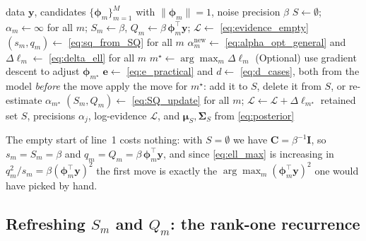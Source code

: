 \documentclass[a4paper]{article}
\renewcommand{\vec}[1]{\boldsymbol{#1}}
\begin{document}
\begin{algorithm}
\caption{Sequential ARD by greedy evidence maximisation \autocite{tipping2003fast}.}
\label{alg:seq_ard}
\begin{algorithmic}[1]
\Require data $\mathbf y$, candidates $\{\vec \phi_m\}_{m=1}^M$ with $\|\vec \phi_m\| = 1$, noise precision $\beta$
\State $S \gets \emptyset$; \quad $\alpha_m \gets \infty$ for all $m$; \quad $S_m \gets \beta$, $Q_m \gets \beta \, \vec \phi_m^\top \mathbf y$; \quad $\mathcal L \gets$ \eqref{eq:evidence_empty}
\Repeat
    \State $(s_m, q_m) \gets$ \eqref{eq:sq_from_SQ} for all $m$
    \State $\alpha_m^{\mathrm{new}} \gets$ \eqref{eq:alpha_opt_general} and $\Delta \ell_m \gets$ \eqref{eq:delta_ell} for all $m$
    \State $m^\star \gets \arg\max_m \Delta \ell_m$
    \State (Optional) use gradient descent to adjust $\vec \phi_{m^\star}$
    \State $\vec e \gets$ \eqref{eq:e_practical} and $d \gets$ \eqref{eq:d_cases}, both from the model \emph{before} the move
    \State apply the move for $m^\star$: add it to $S$, delete it from $S$, or re-estimate $\alpha_{m^\star}$
    \State $(S_m, Q_m) \gets$ \eqref{eq:SQ_update} for all $m$; \quad $\mathcal L \gets \mathcal L + \Delta \ell_{m^\star}$
\State \Return retained set $S$, precisions $\alpha_j$, log-evidence $\mathcal L$, and $\vec \mu_S, \mathbf \Sigma_S$ from \eqref{eq:posterior}
\end{algorithmic}
\end{algorithm}

The empty start of line~1 costs nothing: with $S = \emptyset$ we have $\mathbf C = \beta^{-1}\mathbf I$, so $s_m = S_m = \beta$ and $q_m = Q_m = \beta \, \vec \phi_m^\top \mathbf y$, and since \eqref{eq:ell_max} is increasing in $q_m^2/s_m = \beta (\vec \phi_m^\top \mathbf y)^2$ the first move is exactly the $\arg\max_m (\vec \phi_m^\top \mathbf y)^2$ one would have picked by hand.

\subsection{Refreshing $S_m$ and $Q_m$: the rank-one recurrence} \label{sec:rank_one}
\end{document}
